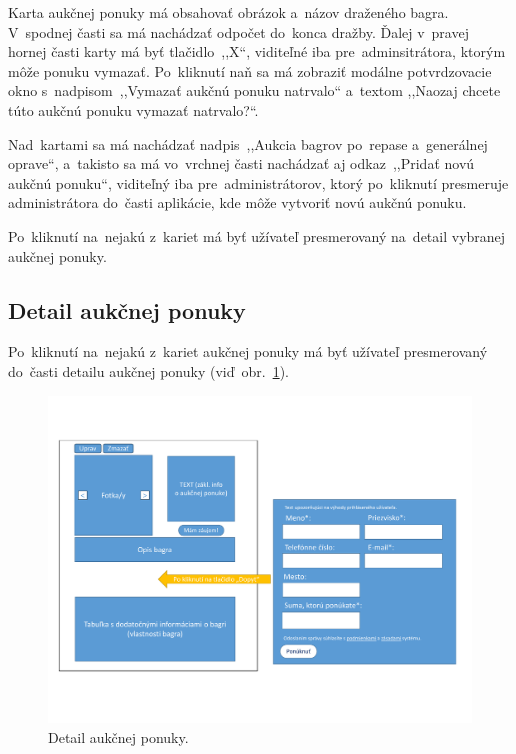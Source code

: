 Karta aukčnej ponuky má obsahovať obrázok a~názov draženého bagra. V~spodnej časti sa má nachádzať odpočet do~konca dražby. Ďalej v~pravej hornej časti karty má byť tlačidlo~,,X``, viditeľné iba pre~adminsitrátora, ktorým môže ponuku vymazať. Po~kliknutí naň sa má zobraziť modálne potvrdzovacie okno s~nadpisom~,,Vymazať aukčnú ponuku natrvalo`` a~textom ,,Naozaj chcete túto aukčnú ponuku vymazať natrvalo?``.

Nad~kartami sa má nachádzať nadpis~,,Aukcia bagrov po~repase a~generálnej oprave``, a~takisto sa má vo~vrchnej časti nachádzať aj odkaz~,,Pridať novú aukčnú ponuku``, viditeľný iba pre~administrátorov, ktorý po~kliknutí presmeruje administrátora do~časti aplikácie, kde môže vytvoriť novú aukčnú ponuku.

Po~kliknutí na~nejakú z~kariet má byť užívateľ presmerovaný na~detail vybranej aukčnej ponuky.

\subsection{Detail aukčnej ponuky}

Po~kliknutí na~nejakú z~kariet aukčnej ponuky má byť užívateľ presmerovaný do~časti detailu aukčnej ponuky (viď~obr.~\ref{auction offer detail}).

\begin{figure}[H]\centering
\includegraphics[width=140mm]{../img/UI concept/auction offer detail}
\caption{Detail aukčnej ponuky.}
\label{auction offer detail}
\end{figure}

